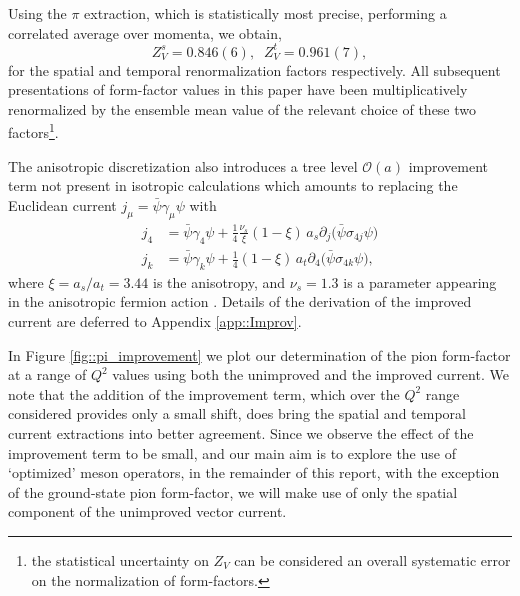 \documentclass[twocolumn,amsmath,amssymb,prd,10pt,floatfix, 
superscriptaddress,nofootinbib, showpacs, preprintnumbers]{revtex4-1}
\begin{document}
Using the $\pi$ extraction, which is statistically most precise, performing a correlated average over momenta, we obtain,
\begin{equation}
	Z_V^s = 0.846(6), \;\; Z_V^t = 0.961(7), \label{ZV}
\end{equation}
for the spatial and temporal renormalization factors respectively. All subsequent presentations of form-factor values in this paper have been multiplicatively renormalized by the ensemble mean value of the relevant choice of these two factors\footnote{the statistical uncertainty on $Z_V$ can be considered an overall systematic error on the normalization of form-factors.}. 


The anisotropic discretization also introduces a tree level $\mathcal{O}(a)$ improvement term not present in isotropic calculations which amounts to replacing the Euclidean current ${j_\mu =\bar{\psi}\gamma_\mu\psi }$ with 
\begin{align}
j_4 &=  \bar{\psi}\gamma_4 \psi + \tfrac{1}{4} \tfrac{\nu_s}{\xi} ( 1- \xi) \, a_s \partial_j \big( \bar{\psi}\sigma_{4j} \psi\big)  \nonumber \\
j_k &=  \bar{\psi}\gamma_k \psi + \tfrac{1}{4} ( 1 - \xi) \, a_t \partial_4 \big( \bar{\psi}\sigma_{4k} \psi\big),
\label{improvement}
\end{align}
where $\xi = a_s/a_t = 3.44$ is the anisotropy, and $\nu_s = 1.3$ is a parameter appearing in the anisotropic fermion action \cite{Edwards:2008ja, Chen:2000ej}. Details of the derivation of the improved current are deferred to Appendix \ref{app::Improv}. 


In Figure \ref{fig::pi_improvement} we plot our determination of the pion form-factor at a range of $Q^2$ values using both the unimproved and the improved current. We note that the addition of the improvement term, which over the $Q^2$ range considered provides only a small shift, does bring the spatial and temporal current extractions into better agreement. Since we observe the effect of the improvement term to be small, and our main aim is to explore the use of `optimized' meson operators, in the remainder of this report, with the exception of the ground-state pion form-factor, we will make use of only the spatial component of the unimproved vector current.
\end{document}
